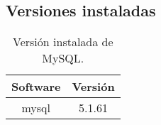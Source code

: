 \subsection{Versiones instaladas}

\begin{table}[!htbp]
\centering
   \begin{tabular}{|c|c|}
      \hline
      \textbf{Software} & \textbf{Versión} \\ \hline
      mysql & 5.1.61 \\ \hline
   \end{tabular}
\caption{Versión instalada de MySQL.}
\label{table:web-mysql-versions}
\end{table}
